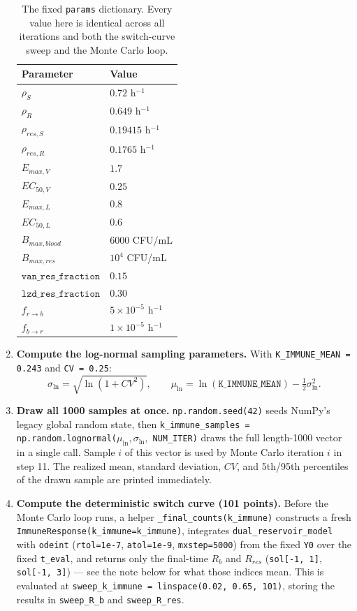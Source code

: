 \documentclass[11pt]{article}
\begin{document}
\begin{enumerate}
\begin{table}[h]
\centering
\begin{tabular}{@{}ll@{}}
\toprule
Parameter & Value \\
\midrule
$\rho_S$ & $0.72$ h$^{-1}$ \\
$\rho_R$ & $0.649$ h$^{-1}$ \\
$\rho_{res,S}$ & $0.19415$ h$^{-1}$ \\
$\rho_{res,R}$ & $0.1765$ h$^{-1}$ \\
$E_{max,V}$ & $1.7$ \\
$EC_{50,V}$ & $0.25$ \\
$E_{max,L}$ & $0.8$ \\
$EC_{50,L}$ & $0.6$ \\
$B_{max,blood}$ & $6000$ CFU/mL \\
$B_{max,res}$ & $10^4$ CFU/mL \\
$\mathtt{van\_res\_fraction}$ & $0.15$ \\
$\mathtt{lzd\_res\_fraction}$ & $0.30$ \\
$f_{r\to b}$ & $5\times10^{-5}$ h$^{-1}$ \\
$f_{b\to r}$ & $1\times10^{-5}$ h$^{-1}$ \\
\bottomrule
\end{tabular}
\caption{The fixed \texttt{params} dictionary. Every value here is identical across all iterations and both the switch-curve sweep and the Monte Carlo loop.}
\label{tab:params}
\end{table}

\item \textbf{Compute the log-normal sampling parameters.} With
\texttt{K\_IMMUNE\_MEAN = 0.243} and \texttt{CV = 0.25}:
\begin{equation}
\sigma_{\ln} = \sqrt{\ln(1+CV^2)}, \qquad
\mu_{\ln} = \ln(\texttt{K\_IMMUNE\_MEAN}) - \tfrac{1}{2}\sigma_{\ln}^2.
\end{equation}

\item \textbf{Draw all 1000 samples at once.} \texttt{np.random.seed(42)}
seeds NumPy's legacy global random state, then
\texttt{k\_immune\_samples = np.random.lognormal(}$\mu_{\ln}, \sigma_{\ln},$
\texttt{NUM\_ITER)} draws the full length-1000 vector in a single call.
Sample $i$ of this vector is used by Monte Carlo iteration $i$ in step 11.
The realized mean, standard deviation, $CV$, and 5th/95th percentiles of the
drawn sample are printed immediately.

\item \textbf{Compute the deterministic switch curve (101 points).} Before
the Monte Carlo loop runs, a helper \texttt{\_final\_counts(k\_immune)}
constructs a fresh \texttt{ImmuneResponse(k\_immune=k\_immune)}, integrates
\texttt{dual\_reservoir\_model} with \texttt{odeint}
(\texttt{rtol=1e-7}, \texttt{atol=1e-9}, \texttt{mxstep=5000}) from the fixed
\texttt{Y0} over the fixed \texttt{t\_eval}, and returns only the final-time
$R_b$ and $R_{res}$ (\texttt{sol[-1, 1]}, \texttt{sol[-1, 3]}) --- see the
note below for what those indices mean. This is
evaluated at \texttt{sweep\_k\_immune = linspace(0.02, 0.65, 101)}, storing
the results in \texttt{sweep\_R\_b} and \texttt{sweep\_R\_res}.


\end{enumerate}
\end{document}
